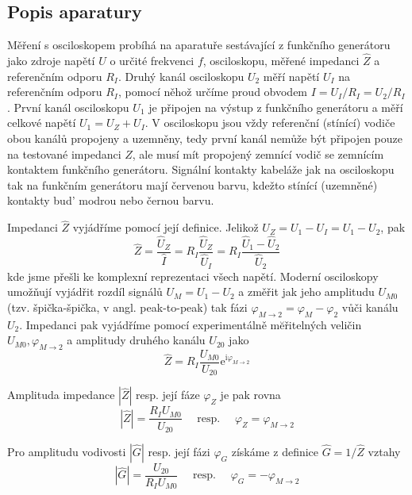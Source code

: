 \documentclass[czech,11pt,a4paper]{article}
\begin{document}
\begin{multicols}{2}
		\subsection{Popis aparatury}
		Měření s osciloskopem probíhá na aparatuře sestávající z funkčního generátoru jako zdroje napětí $U$ o určité frekvenci $f$, osciloskopu, měřené impedanci $\hat{Z}$ a referenčním odporu $R_{I}$. Druhý kanál osciloskopu $U_{2}$ měří napětí $U_{I}$ na referenčním odporu $R_{I}$, pomocí něhož určíme proud obvodem $I=U_{I} / R_{I}=U_{2} / R_{I}$. První kanál osciloskopu $U_{1}$ je připojen na výstup z funkčního generátoru a měří celkové napětí $U_{1}=U_{Z}+U_{I}$. V osciloskopu jsou vždy referenční (stínící) vodiče obou kanálů propojeny a uzemněny, tedy první kanál nemůže být připojen pouze na testované impedanci $Z$, ale musí mít propojený zemnící vodič se zemnícím kontaktem funkčního generátoru. Signální kontakty kabeláže jak na osciloskopu tak na funkčním generátoru mají červenou barvu, kdežto stínící (uzemněné) kontakty bud’ modrou nebo černou barvu.
		
		Impedanci $\hat{Z}$ vyjádříme pomocí její definice. Jelikož $U_{Z}=U_{1}-U_{I}=U_{1}-U_{2}$, pak
		\begin{equation}
			\hat{Z}=\frac{\hat{U}_{Z}}{\hat{I}}=R_{I} \frac{\hat{U}_{Z}}{\hat{U}_{I}}=R_{I} \frac{\hat{U}_{1}-\hat{U}_{2}}{\hat{U}_{2}}
		\end{equation}
		kde jsme přešli ke komplexní reprezentaci všech napětí. Moderní osciloskopy umožňují vyjádřit rozdíl signálů $U_{M}=U_{1}-U_{2}$ a změřit jak jeho amplitudu $U_{M 0}$ (tzv. špička-špička, v angl. peak-to-peak) tak fázi $\varphi_{M \rightarrow 2}=\varphi_{M}-\varphi_{2}$ vůči kanálu $U_{2}$. Impedanci pak vyjádříme pomocí experimentálně mĕřitelných veličin $U_{M 0}, \varphi_{M \rightarrow 2}$ a amplitudy druhého kanálu $U_{20}$ jako
		\begin{equation}
			\hat{Z}=R_{I} \frac{U_{M 0}}{U_{20}} \mathrm{e}^{\mathrm{i} \varphi_{M \rightarrow 2}}
		\end{equation}
		
		Amplituda impedance $|\hat{Z}|$ resp. její fáze $\varphi_{Z}$ je pak rovna
		$$
		|\hat{Z}|=\frac{R_{I} U_{M 0}}{U_{20}} \quad \text { resp. } \quad \varphi_{Z}=\varphi_{M \rightarrow 2}
		$$
		
		Pro amplitudu vodivosti $|\hat{G}|$ resp. její fázi $\varphi_{G}$ získáme z definice $\hat{G}=1 / \hat{Z}$ vztahy
		$$
		|\hat{G}|=\frac{U_{20}}{R_{I} U_{M 0}} \quad \text { resp. } \quad \varphi_{G}=-\varphi_{M \rightarrow 2}
		$$
		

\end{multicols}
\end{document}
